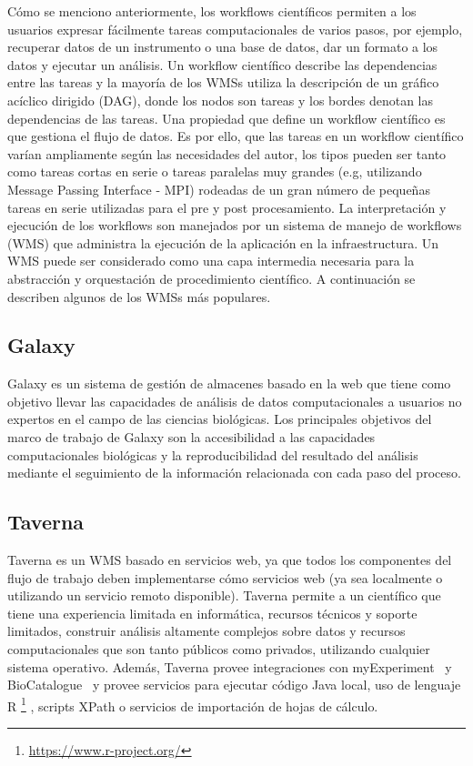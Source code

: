 Cómo se menciono anteriormente, los workflows científicos permiten a los usuarios expresar fácilmente tareas computacionales de varios pasos, por ejemplo, recuperar datos de un instrumento o una base de datos, dar un formato a los datos y ejecutar un análisis. 
Un workflow científico describe las dependencias entre las tareas y la mayoría de los WMSs utiliza la descripción de un gráfico acíclico dirigido (DAG), donde los nodos son tareas y los bordes denotan las dependencias de las tareas.
Una propiedad que define un workflow científico es que gestiona el flujo de datos. Es por ello, que las tareas en un  workflow científico varían ampliamente según las necesidades del autor, los tipos pueden ser tanto como tareas cortas en serie o tareas paralelas muy grandes (e.g, utilizando Message Passing Interface - MPI) rodeadas de un gran número de pequeñas tareas en serie utilizadas para el pre y post procesamiento.
La interpretación y ejecución de los workflows son manejados por un sistema de manejo de workflows (WMS) que administra la ejecución de la aplicación en la infraestructura. 
Un WMS puede ser considerado como una capa intermedia necesaria para la abstracción y orquestación de procedimiento científico. A continuación se describen algunos de los WMSs más populares.

\subsection{Galaxy}	
Galaxy \cite{goecks2010galaxy} es un sistema de gestión de almacenes basado en la web que tiene como objetivo llevar las capacidades de análisis de datos computacionales a usuarios no expertos en el campo de las ciencias biológicas. Los principales objetivos del marco de trabajo de Galaxy son la accesibilidad a las capacidades computacionales biológicas y la reproducibilidad del resultado del análisis mediante el seguimiento de la información relacionada con cada paso del proceso. 

\subsection{Taverna}	
Taverna \cite{DBLP:journals/bioinformatics/OinnAFMSGCGPWL04} es un WMS basado en servicios web, ya que todos los componentes del flujo de trabajo deben implementarse cómo servicios web (ya sea localmente o utilizando un servicio remoto disponible). 
Taverna permite a un científico que tiene una experiencia limitada en informática, recursos técnicos y soporte limitados, construir análisis altamente complejos sobre datos y recursos computacionales que son tanto públicos como privados, utilizando cualquier sistema operativo.
Además, Taverna provee integraciones con myExperiment~\cite{goble2010myexperiment} y BioCatalogue~\cite{bhagat2010biocatalogue} y provee servicios para ejecutar código Java local, uso de lenguaje R \footnote{\url{https://www.r-project.org/}} , scripts XPath o servicios de importación de hojas de cálculo.

